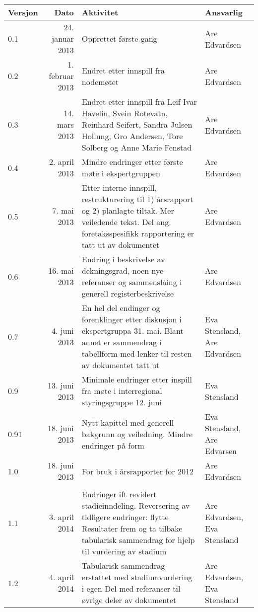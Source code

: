 \documentclass[norsk, a4paper, twocolumn]{report}
\begin{document}
\begin{table}[ht]
  \centering
  \begin{tabular}{lrp{8cm}p{2.5cm}}
    \hline
    Versjon & Dato & Aktivitet & Ansvarlig \\
    \hline
    0.1 & 24. januar 2013 & Opprettet første gang & Are Edvardsen \\
    0.2 & 1. februar 2013 & Endret etter innspill fra nodemøtet &
    Are Edvardsen \\
    0.3 & 14. mars 2013 & Endret etter innspill fra Leif Ivar Havelin,
    Svein Rotevatn,
    Reinhard Seifert, Sandra Julsen Hollung, Gro Andersen, Tore Solberg og
    Anne Marie Fenstad & Are Edvardsen \\
    0.4 & 2. april 2013 & Mindre endringer etter første møte i ekspertgruppen &
    Are Edvardsen \\
    0.5 & 7. mai 2013 & Etter interne innspill, restrukturering til 1)
    årsrapport og 2) planlagte tiltak. Mer veiledende tekst. Del ang.
    foretaksspesifikk rapportering er tatt ut av dokumentet & Are Edvardsen \\
    0.6 & 16. mai 2013 & Endring i beskrivelse av
    dekningsgrad, noen nye referanser og sammenslåing i generell
    registerbeskrivelse & Are Edvardsen \\
    0.7 & 4. juni 2013 & En hel del endinger og forenklinger etter diskusjon i
    ekspertgruppa 31. mai. Blant annet er sammendrag i tabellform med lenker
    til resten av dokumentet tatt ut & Eva Stensland, Are Edvardsen \\
    0.9 & 13. juni 2013 & Minimale endringer etter inspill fra møte i
    interregional styringsgruppe 12. juni & Eva Stensland \\
    0.91 & 18. juni 2013 & Nytt kapittel med generell bakgrunn og veiledning.
    Mindre endringer på form & Eva Stensland, Are Edvarsen \\
    1.0 & 18. juni 2013 & For bruk i årsrapporter for 2012 & Are Edvardsen \\
     & & & \\
    1.1 & 3. april 2014 & Endringer ift revidert stadieinndeling. Reversering
    av tidligere endringer: flytte Resultater frem og ta tilbake
    tabularisk sammendrag for hjelp til vurdering av stadium & Are Edvardsen,
    Eva Stensland \\
    1.2 & 4. april 2014 & Tabularisk sammendrag erstattet med stadiumvurdering
    i egen Del med referanser til øvrige deler av dokumentet & Are Edvardsen,
    Eva Stensland \\

\end{tabular}
\end{table}
\end{document}
